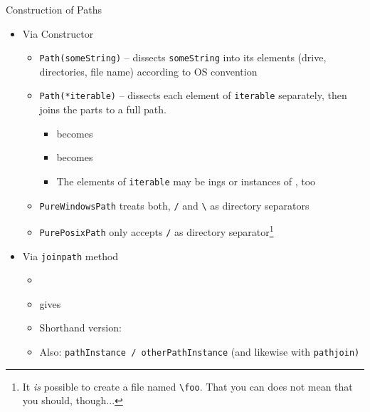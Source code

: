 \begin{frame}[fragile]{Construction of Paths}
%
\begin{itemize}
\item Via Constructor
	\begin{itemize}
	\item \texttt{Path(someString)} -- dissects \texttt{someString} into its elements (drive, directories, file name) according to OS convention
	\item \texttt{Path(*iterable)} -- dissects each element of \texttt{iterable} separately, then joins the parts to a full path.
		\begin{itemize}
		\item {} becomes 
		\item {} becomes 
		\item The elements of \texttt{iterable} may be ings or instances of , too
		\end{itemize}
	\item \texttt{PureWindowsPath} treats both, \texttt{/} and \texttt{\textbackslash} as directory separators
	\item \texttt{PurePosixPath} only accepts \texttt{/} as directory separator\footnote{%
		It \emph{is} possible to create a file named \texttt{\textbackslash foo}. That you can does not mean that you should, though...
	}
	\end{itemize}
\item Via \texttt{joinpath} method
	\begin{itemize}
	\item {}
	\item {} gives 
	\item Shorthand version: 
	\item Also: \texttt{pathInstance / otherPathInstance} (and likewise with \texttt{pathjoin)}
	\end{itemize}
\end{itemize}
%
\end{frame}


